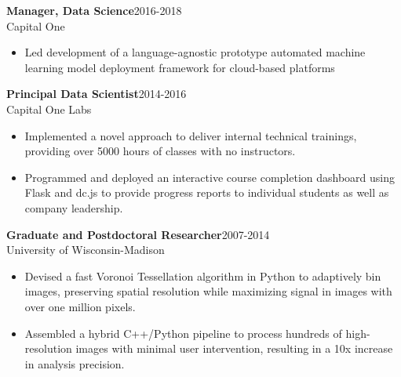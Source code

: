 \documentclass[11pt]{res}
\begin{document}
\begin{resume}
{\bf Manager, Data Science}\hfill\mbox{2016-2018}\\
Capital One
\vspace*{0.01 in}\begin{itemize} \itemsep -2pt
  \item Led development of a language-agnostic prototype automated machine learning model
    deployment framework for cloud-based platforms
\end{itemize}
\vspace{-0.15in}

{\bf Principal Data Scientist}\hfill\mbox{2014-2016}\\
Capital One Labs
\vspace*{0.01 in}\begin{itemize} \itemsep -2pt 
  \item Implemented a novel approach to deliver internal technical
    trainings, providing over 5000 hours of classes with no instructors.
  \item Programmed and deployed an interactive course completion dashboard using Flask
    and dc.js to provide progress reports to individual students as
    well as company leadership.
  \end{itemize}
\vspace{-0.15in}

{\bf Graduate and Postdoctoral Researcher}\hfill\mbox{2007-2014}\\
University of Wisconsin-Madison
                  \vspace* {0.01 in}\begin{itemize} \itemsep -2pt
                    \item Devised a fast Voronoi Tessellation
                      algorithm in Python
                      to adaptively bin images, preserving spatial
                      resolution while maximizing signal in images
                      with over one million pixels.
                   \item Assembled a hybrid C++/Python
                     pipeline to process hundreds of high-resolution images with
                     minimal user intervention, resulting in a 10x increase in analysis precision.
                  \end{itemize} 
\vspace{-0.1in}


\end{resume}
\end{document}
